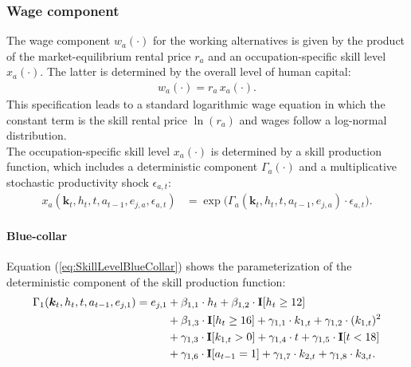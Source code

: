 \subsubsection*{Wage component}
The wage component $w_{a}(\cdot)$ for the working alternatives is given by the product of the market-equilibrium rental price $r_{a}$ and an occupation-specific skill level $x_{a}(\cdot)$. The latter is determined by the overall level of human capital:
%
\begin{align*}
w_{a}(\cdot) = r_{a} \, x_{a}(\cdot).
\end{align*}
%
This specification leads to a standard logarithmic wage equation in which the constant term is the skill rental price $\ln(r_{a})$ and wages follow a log-normal distribution.\\

\noindent The occupation-specific skill level $x_{a}(\cdot)$ is determined by a skill production function, which includes a deterministic component $\Gamma_a(\cdot)$ and a multiplicative stochastic productivity shock $\epsilon_{a,t}$:
%
\begin{align}
    x_{a}(\bm{k}_t, h_t, t, a_{t-1}, e_{j, a}, \epsilon_{a,t}) & = \exp \big( \Gamma_{a}(\bm{k}_t,  h_t, t, a_{t-1}, e_{j,a}) \cdot \epsilon_{a,t} \big). \nonumber
\end{align}
\paragraph{Blue-collar}
Equation (\ref{eq:SkillLevelBlueCollar}) shows the parameterization of the deterministic component of the skill production function:
%
\begin{align}\label{eq:SkillLevelBlueCollar}
    \Gamma_1(\bm{k}_t, h_t, t, a_{t-1}, e_{j, 1}) = e_{j,1} & + \beta_{1,1} \cdot h_t + \beta_{1, 2} \cdot {\textbf{I}}[h_t \geq 12] \\ \nonumber
                                  & + \beta_{1,3} \cdot {\textbf{I}}[h_t\geq 16] + \gamma_{1, 1} \cdot  k_{1,t} + \gamma_{1,2} \cdot  (k_{1,t})^2 \\ \nonumber
                                & + \gamma_{1,3} \cdot  {\textbf{I}}[k_{1,t} > 0] + \gamma_{1,4} \cdot  t + \gamma_{1,5} \cdot {\textbf{I}}[t < 18]\\ \nonumber
                                  & + \gamma_{1,6} \cdot {\textbf{I}}[a_{t-1} = 1] + \gamma_{1,7} \cdot  k_{2,t} + \gamma_{1,8} \cdot  k_{3,t}. \nonumber
\end{align}
%

